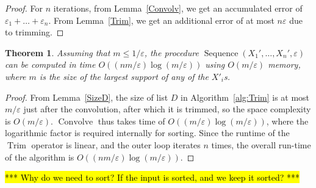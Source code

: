 \documentclass[review]{elsarticle}
\newtheorem{theorem}{Theorem}
\DeclareMathOperator{\Trim}{Trim}
\DeclareMathOperator{\Sequence}{Sequence}
\begin{document}
\begin{proof} For $n$ iterations, from Lemma~\ref{Convolv}, we get an accumulated error of 
$\varepsilon_1 +\dots+ \varepsilon_n$. From Lemma~\ref{Trim}, we get an additional error of at most $n\varepsilon$ due to trimming. 
\end{proof}


\begin{theorem} \label{appSeqComplexTheorem}
Assuming that $m \leq 1/\varepsilon$, the procedure
$\Sequence(X_1',\dots,X_n', \varepsilon)$ can be computed
in time $O((nm/\varepsilon)\log(m/\varepsilon))$ using $O(m/\varepsilon)$ memory, where $m$ is the size of the largest support of any of the $X'_i$s.
\end{theorem} 

\begin{proof}
From Lemma~\ref{SizeD}, the size of list $D$ in 
Algorithm~\ref{alg:Trim} is at most $m/\varepsilon$
just after the convolution, after which it is trimmed, so the space complexity 
is $O(m/\varepsilon)$.
$\operatorname{Convolve}$ thus takes time of $O((m/\varepsilon)\log(m/\varepsilon))$, where the logarithmic factor
is required internally
for sorting. Since the runtime of  the $\Trim$ operator is linear, and the
outer loop iterates $n$ times, the overall 
run-time of the algorithm is $O((n m/\varepsilon) \log(m/\varepsilon))$.
\end{proof}

\hl{ *** Why do we need to sort? If the input is sorted, and we keep it sorted? ***}


\end{document}
